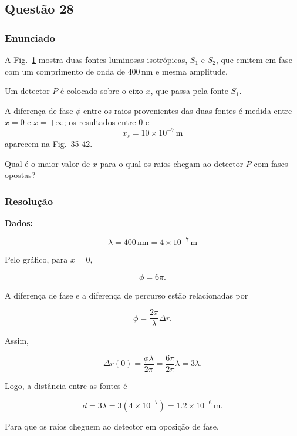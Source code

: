 \subsection{Questão 28}

\subsubsection{Enunciado}

A Fig.~\ref{fig:35-42} mostra duas fontes luminosas isotrópicas, \(S_1\) e \(S_2\), que emitem em fase com um comprimento de onda de \(400\,\text{nm}\) e mesma amplitude.

Um detector \(P\) é colocado sobre o eixo \(x\), que passa pela fonte \(S_1\).

A diferença de fase \(\phi\) entre os raios provenientes das duas fontes é medida entre \(x = 0\) e \(x = +\infty\); os resultados entre \(0\) e
\[
x_s = 10 \times 10^{-7}\,\text{m}
\]
aparecem na Fig.~35-42.

Qual é o maior valor de \(x\) para o qual os raios chegam ao detector \(P\) com fases opostas?

\begin{figure}[h]
    \centering
    \label{fig:35-42}
\end{figure}

\vspace{0.5cm}

\subsubsection{Resolução}
\textbf{Dados:}

\[
\lambda = 400\,\text{nm} = 4\times10^{-7}\,\text{m}
\]

Pelo gráfico, para \(x=0\),

\[
\phi = 6\pi.
\]

A diferença de fase e a diferença de percurso estão relacionadas por

\[
\phi=\frac{2\pi}{\lambda}\Delta r.
\]

Assim,

\[
\Delta r(0)=\frac{\phi\lambda}{2\pi}
=\frac{6\pi}{2\pi}\lambda
=3\lambda.
\]

Logo, a distância entre as fontes é

\[
d=3\lambda
=3(4\times10^{-7})
=1.2\times10^{-6}\,\text{m}.
\]

Para que os raios cheguem ao detector em oposição de fase,

